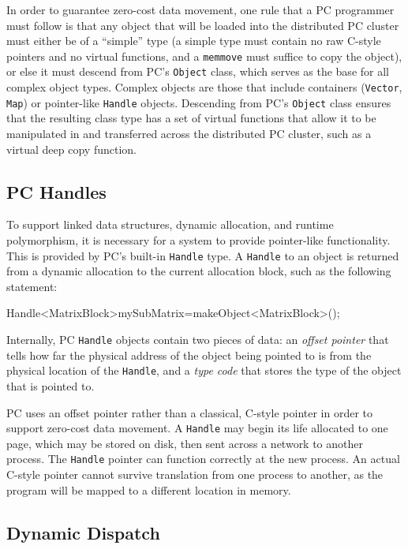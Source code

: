 In order to guarantee zero-cost data movement,
one rule that a PC programmer must follow is that any object that will
be loaded into the distributed PC cluster must either be of a ``simple'' type (a simple type
must contain no raw C-style pointers and no 
virtual functions, and a \texttt{memmove}
must suffice to copy the object), or else it must descend from PC's \texttt{Object} class, which serves as the base for all complex object types.
Complex objects are those that include containers (\texttt{Vector}, \texttt{Map}) or pointer-like \texttt{Handle} objects.  Descending from PC's \texttt{Object} class
ensures that the resulting class type has a set of virtual functions
that allow it to be manipulated in and transferred across the
distributed PC cluster, 
such as a virtual deep copy function.  

\subsection{PC Handles}

To support linked data structures, dynamic allocation, and runtime polymorphism, it is necessary for a 
system to provide pointer-like functionality.  This is provided by PC's built-in \texttt{Handle} type.  
A \texttt{Handle} to an object is returned from a dynamic allocation to the current allocation block,
such as the following statement:

\begin{codesmall}
Handle<MatrixBlock>mySubMatrix=makeObject<MatrixBlock>();
\end{codesmall}

Internally, PC \texttt{Handle} objects contain two pieces of data: an \emph{offset pointer} that tells how far
the physical address of the object being pointed to is from the physical location of the 
\texttt{Handle}, and a \emph{type code} that stores the type of the
object that is pointed to.  

PC uses an offset pointer rather than a classical, C-style pointer in order to support
zero-cost data movement.  
A \texttt{Handle} may begin its life allocated
to one page, which may be stored on disk, then sent across a network
to another process.  The \texttt{Handle} pointer
can function correctly at the new process.  
An actual C-style pointer
cannot survive translation from one process to another, as the program will be mapped to a different location in memory.

\subsection{Dynamic Dispatch}
\label{sec:dyn_dis}

